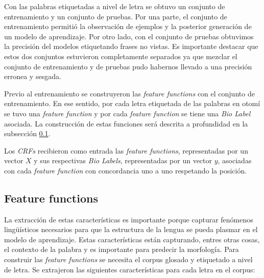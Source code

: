 \documentclass[letterpaper,12pt,oneside]{book}
\theoremstyle{definition}
\begin{document}
Con las palabras etiquetadas a nivel de letra se obtuvo un conjunto de entrenamiento y un conjunto de pruebas. Por una parte, el conjunto de entrenamiento permitió la observación de ejemplos y la posterior generación de un modelo de aprendizaje. Por otro lado, con el conjunto de pruebas obtuvimos la precisión del modelos etiquetando frases no vistas. Es importante destacar que estos dos conjuntos estuvieron completamente separados ya que mezclar el conjunto de entrenamiento y de pruebas pudo habernos llevado a una precisión erronea y sesgada.

Previo al entrenamiento se construyeron las \textit{feature functions} con el conjunto de entrenamiento. En ese sentido, por cada letra etiquetada de las palabras en otomí se tuvo una \textit{feature function} y por cada \textit{feature function} se tiene una \textit{Bio Label} asociada. La construcción de estas funciones será descrita a profundidad en la subsección \ref{subsec:feature}.


Los \textit{CRFs} recibieron como entrada las \textit{feature functions}, representadas por un vector $X$ y sus respectivas \textit{Bio Labels}, representadas por un vector $y$, asociadas con cada \textit{feature function} con concordancia uno a uno respetando la posición. 

\subsection{Feature functions} \label{subsec:feature}

La extracción de estas características es importante porque capturar fenómenos lingüísticos necesarios para que la estructura de la lengua se pueda plasmar en el modelo de aprendizaje. Estas características están capturando, entres otras cosas, el contexto de la palabra y es importante para predecir la morfología. Para construir las \textit{feature functions} se necesita el corpus glosado y etiquetado a nivel de letra. Se extrajeron las siguientes características para cada letra en el corpus:
\end{document}
